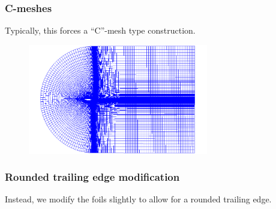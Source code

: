 \documentclass{beamer}
\begin{document}
\begin{frame}
  \frametitle{C-meshes}

  Typically, this forces a ``C''-mesh type construction.

  \begin{figure}
    \centering
    \includegraphics[width=0.7\textwidth]{figs/Sec41_a8_mesh}
  \end{figure}
\end{frame}

\begin{frame}
  \frametitle{Rounded trailing edge modification}

  Instead, we modify the foils slightly to allow for a rounded trailing edge.

  \begin{figure}
    \centering
  \end{figure}
\end{frame}
\end{document}
